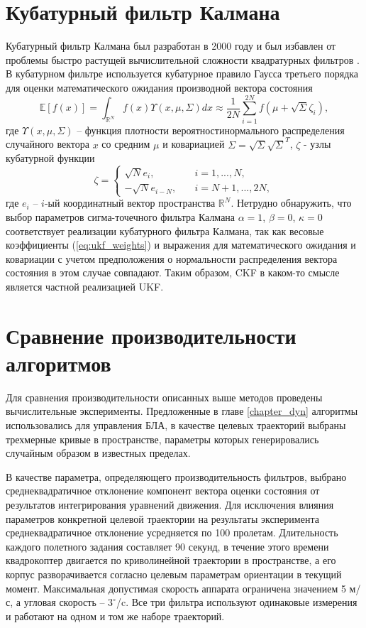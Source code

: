 \section{Кубатурный фильтр Калмана}
Кубатурный фильтр Калмана был разработан в 2000 году и был избавлен от
проблемы быстро растущей вычислительной сложности квадратурных фильтров \cite{Arasaratnam}.
В кубатурном фильтре используется кубатурное правило Гаусса третьего порядка для
оценки математического ожидания производной вектора состояния
\begin{equation*}
\mathbb{E}[f(x)] = \int_{\mathbb{R}^N}^{} f(x) \Upsilon(x, \mu, \Sigma) dx \approx \frac{1}{2N} \sum_{i=1}^{2N}f(\mu + \sqrt \Sigma \zeta_i),
\end{equation*}
где $\Upsilon(x, \mu, \Sigma)$ -- функция плотности вероятностинормального распределения случайного вектора $x$
со средним $\mu$ и ковариацией $\Sigma = \sqrt \Sigma \sqrt{\Sigma}^T$, $\zeta$ - узлы кубатурной функции
\begin{equation*}
\zeta =
\begin{cases}
\sqrt N e_i, & \quad i = 1,...,N,\\
-\sqrt N e_{i-N}, &\quad i = N+1,...,2N,
\end{cases}
\end{equation*}
где $e_i$ -- $i$-ый координатный вектор пространства $\mathbb R^N$.
Нетрудно обнаружить, что  выбор параметров сигма-точечного фильтра Калмана
$\alpha=1$, $\beta=0$, $\kappa=0$
соответствует реализации кубатурного фильтра Калмана,
так как весовые коэффициенты (\ref{eq:ukf_weights})
и выражения для математического ожидания и ковариации с учетом предположения
о нормальности распределения вектора состояния в этом случае совпадают.
Таким образом, CKF в каком-то смысле является частной реализацией UKF.

\section{Сравнение производительности алгоритмов}

Для сравнения производительности описанных выше методов проведены вычислительные эксперименты.
Предложенные в главе \ref{chapter_dyn} алгоритмы использовались для управления БЛА, в качестве целевых траекторий выбраны трехмерные кривые в пространстве, параметры которых генерировались случайным образом в известных пределах.

В качестве параметра, определяющего производительность фильтров,
выбрано среднеквадратичное отклонение компонент вектора оценки состояния от результатов интегрирования уравнений движения.
Для исключения влияния параметров конкретной целевой траектории на результаты эксперимента
среднеквадратичное отклонение усредняется по 100 пролетам.
Длительность каждого полетного задания составляет 90 секунд, в течение этого времени квадрокоптер
двигается по криволинейной траектории в пространстве,
а его корпус разворачивается согласно целевым параметрам ориентации в текущий момент.
Максимальная допустимая скорость аппарата ограничена значением 5 м/с,
а угловая скорость -- $3^\circ$/c. Все три фильтра используют одинаковые измерения
и работают на одном и том же наборе траекторий.

